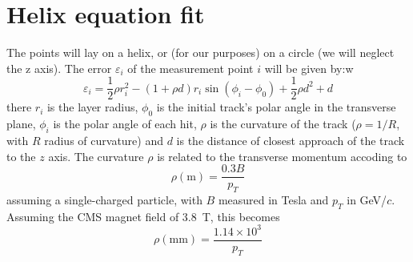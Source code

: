\documentclass[10pt,a4paper]{article}
\begin{document}
\section{Helix equation fit}
The points will lay on a helix, or (for our purposes) on a circle (we
will neglect the z axis).  The error $\varepsilon_i$ of the
measurement point $i$ will be given by:w
\begin{equation}
  \label{eq:helix}
  \varepsilon_i = \frac 1 2 \rho r_i^2 - (1 + \rho d) r_i \sin(\phi_i-\phi_0) + \frac 1 2 \rho d^2 + d
\end{equation}
there $r_i$ is the layer radius, $\phi_0$ is the initial track's polar
angle in the transverse plane, $\phi_i$ is the polar angle of each
hit, $\rho$ is the curvature of the track ($\rho=1/R$, with $R$ radius
of curvature) and $d$ is the distance of closest approach of the track
to the $z$ axis.  The curvature $\rho$ is related to the transverse
momentum accoding to
\begin{equation}
  \rho (\mathrm{m}) = \frac {0.3 B} {p_T} 
\end{equation}
assuming a single-charged particle, with $B$ measured in Tesla and
$p_T$ in GeV/$c$. Assuming the CMS magnet field of 3.8~T, this becomes
\begin{equation}
  \rho (\mathrm{mm}) = \frac {1.14\times 10^3} {p_T} 
\end{equation}
\end{document}
